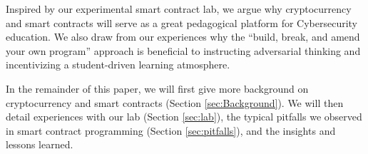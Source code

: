 \documentclass{llncs}
\newcommand{\elaine}[1]{}
\newcommand{\ignore}[1]{}
\renewcommand{\paragraph}[1]{\vspace{5pt} \noindent{\bf #1}}
\begin{document}
\paragraph{Broader insights gained.}
Inspired by our experimental 
smart contract lab, 
we argue why cryptocurrency and smart contracts 
will serve as a great pedagogical platform 
for Cybersecurity education.
We also draw from our experiences
why the ``build, break, and amend your own program'' 
approach is beneficial to instructing adversarial thinking
and incentivizing a student-driven learning 
atmosphere.

\paragraph{Roadmap.}
In the remainder of this paper, we will first give more background on 
cryptocurrency and smart contracts (Section \ref{sec:Background}). 
We will then detail experiences with our lab (Section \ref{sec:lab}),  
the typical pitfalls we observed in smart  
contract programming (Section \ref{sec:pitfalls}), 
and the insights and lessons learned. 



\ignore{
Smart contract design also requires economic thinking. We use a running example about a rock-paper-scissors game. To help keep incentives in focus, we reward the winner with a monetary prize, so both participants have a stake in the outcome.  Other, more clearly “useful” application include derivative financial instruments, for example that allow people to buy or sell insurance against events that can be “logged” by the network, such as the price of another cryptocurrency. Smart contracts can also be used to raise “crowdfunding” money with a Kickstarter-like assurance contract, that gives contributors a refund if a donations target isn’t reached. In all of these applications, we will want to guarantee that the smart contracts are ``fair'' and aren't profitable to exploit.
}
\end{document}
